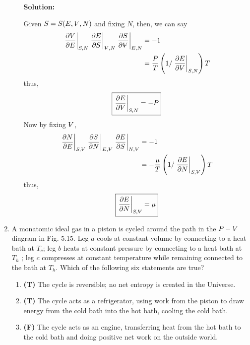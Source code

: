 \documentclass[10pt]{article}
\newenvironment{Solution}
    {\textbf{Solution:}
    
    \vspace{5mm}
    \begin{tcolorbox}
    }
    {
    \end{tcolorbox}
    \vspace{5mm}
    }
\newcommand{\vol}{{\ooalign{\hfil$V$\hfil\cr\kern0.08em--\hfil\cr}}}
\begin{document}
\begin{enumerate}
\begin{enumerate}
\begin{Solution}
    Given $S = S(E,\vol,N)$ and fixing $N$, then, we can say
    \begin{align}
        \left.\frac{\partial \vol}{\partial E}\right|_{S,N} \left.\frac{\partial E}{\partial S}\right|_{\scriptsize{\vol},N} \left.\frac{\partial S}{\partial \vol}\right|_{E,N} &= -1\\
        &= \frac{P}{T}\left(1 /\left.\frac{\partial E}{\partial \vol}\right|_{S, N}\right) T
    \end{align}
    thus,
    \begin{equation}
        \boxed{
        \left.\frac{\partial E}{\partial \vol}\right|_{S, N} = -P
        }
    \end{equation}
    Now by fixing $\vol$,
    \begin{align}
        \left.\frac{\partial N}{\partial E}\right|_{S, \scriptsize{\vol}} \left.\frac{\partial S}{\partial N}\right|_{E, \scriptsize{\vol}} \left.\frac{\partial E}{\partial S}\right|_{N, \scriptsize{\vol}} &= -1\\
        &= -\frac{\mu}{T}\left(1 /\left.\frac{\partial E}{\partial N}\right|_{S, \scriptsize{\vol}}\right) T
    \end{align}
    thus,
    \begin{equation}
        \boxed{
        \left.\frac{\partial E}{\partial N}\right|_{S, \scriptsize{\vol}} = \mu
        }
    \end{equation}
        
    \end{Solution}
\end{enumerate}
\newpage 

\item A monatomic ideal gas in a piston is cycled around the path in the $P -\vol$ diagram in Fig. 5.15. Leg $a$ cools at constant volume by connecting to a heat bath at $T_c$; leg $b$ heats at constant pressure by connecting to a heat bath at $T_h$ ; leg $c$ compresses at constant temperature while remaining connected to the bath at $T_h$.
Which of the following six statements are true?
\begin{enumerate}
    \item \textbf{(T)} The cycle is reversible; no net entropy is created in the Universe.
    
    \item \textbf{(T)} The cycle acts as a refrigerator, using work from the piston to draw energy from the cold bath into the hot bath, cooling the cold bath.
    
    
    \item \textbf{(F)} The cycle acts as an engine, transferring heat from the hot bath to the cold bath and doing positive net work on the outside world.
    

\end{enumerate}
\end{enumerate}
\end{document}
